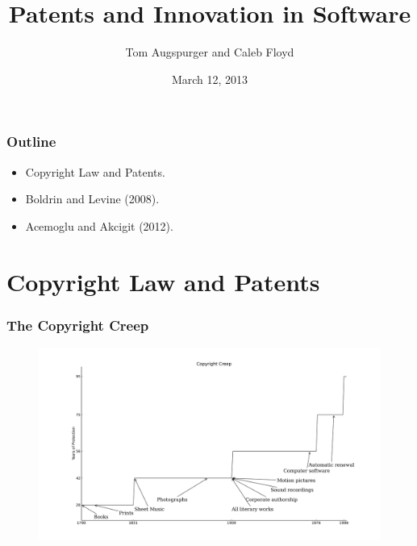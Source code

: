 \documentclass{beamer}
\title{Patents and Innovation in Software}
\author{Tom Augspurger and Caleb Floyd}
\date{March 12, 2013}
\begin{document}
\frame{\titlepage}

\begin{frame}[t]\frametitle{Outline}
    
\begin{itemize}
  \item Copyright Law and Patents.
  \item Boldrin and Levine (2008).
  \item Acemoglu and Akcigit (2012).
\end{itemize}

\end{frame}

\section{Copyright Law and Patents}
\label{sec:copyright_law_and_patents}

\begin{frame}[t]
	\frametitle{The Copyright Creep}
  \fontsize{6pt}{7.2}\selectfont
	\vspace{-8mm}
	\begin{center}
	\begin{figure}[hb]
	  \includegraphics[scale=.315]{copyright_creep.png}
	  \label{fig:copyright_creep}
	\end{figure}
	\end{center}
\end{frame}
\end{document}

